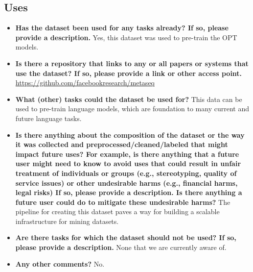 \documentclass[11pt]{article}
\begin{document}
\subsection{Uses}
\begin{itemize}
    \item \textbf{Has the dataset been used for any tasks already? If so, please provide a description.} Yes, this dataset was used to pre-train the OPT models.
    \item \textbf{Is there a repository that links to any or all papers or systems that use the dataset? If so, please provide a link or other access point.} \url{https://github.com/facebookresearch/metaseq}
    \item \textbf{What (other) tasks could the dataset be used for?} This data can be used to pre-train language models, which are foundation to many current and future language tasks.
    \item \textbf{Is there anything about the composition of the dataset or the way it was collected and preprocessed/cleaned/labeled that might impact future uses? For example, is there anything that a future user might need to know to avoid uses that could result in unfair treatment of individuals or groups (e.g., stereotyping, quality of service issues) or other undesirable harms (e.g., financial harms, legal risks) If so, please provide a description. Is there anything a future user could do to mitigate these undesirable harms?} The pipeline for creating this dataset paves a way for building a scalable infrastructure for mining datasets.
    \item \textbf{Are there tasks for which the dataset should not be used? If so, please provide a description.} None that we are currently aware of.
    \item \textbf{Any other comments?} No.
\end{itemize}
\end{document}
